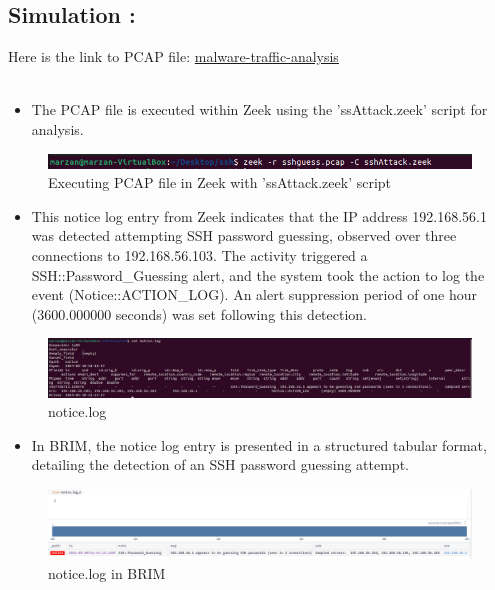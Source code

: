 \subsection{Simulation : }
Here is the link to PCAP file:
\href{https://www.malware-traffic-analysis.net/tutorials/index.html}{malware-traffic-analysis}\\\\
\begin{itemize}
    \item The PCAP file is executed within Zeek using the 'ssAttack.zeek' script for analysis.
\end{itemize}
\begin{figure}[H]
    \centering
    \includegraphics[width=1\linewidth]{images//UDP_reflection/ssh_1.png}
    \caption{Executing PCAP file in Zeek with 'ssAttack.zeek' script}
    \label{fig:enter-label}
\end{figure}

\begin{itemize}
    \item This notice log entry from Zeek indicates that the IP address 192.168.56.1 was detected attempting SSH password guessing, observed over three connections to 192.168.56.103. The activity triggered a SSH::Password\_Guessing alert, and the system took the action to log the event (Notice::ACTION\_LOG). An alert suppression period of one hour (3600.000000 seconds) was set following this detection.
\end{itemize}
\begin{figure}[H]
    \centering
    \includegraphics[width=1\linewidth]{images//UDP_reflection/ssh_2.png}
    \caption{notice.log}
    \label{fig:enter-label}
\end{figure}

\begin{itemize}
    \item In BRIM, the notice log entry is presented in a structured tabular format, detailing the detection of an SSH password guessing attempt.
\end{itemize}
\begin{figure}[H]
    \centering
    \includegraphics[width=1\linewidth]{images//UDP_reflection/ssh_3.png}
    \caption{notice.log in BRIM}
    \label{fig:enter-label}
\end{figure}


